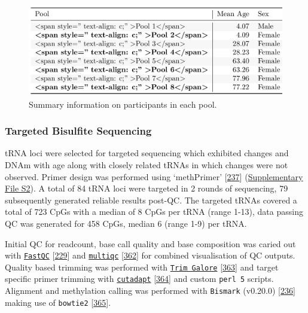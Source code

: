 \documentclass[
]{book}
\begin{document}
\begin{figure}

{\centering \includegraphics[width=1\linewidth]{figs/poolSummaryTable} 

}

\caption{Summary information on participants in each pool.}\label{fig:poolSummaryTable}
\end{figure}



\hypertarget{targetedBiSseq}{%
\subsubsection{Targeted Bisulfite Sequencing}\label{targetedBiSseq}}

tRNA loci were selected for targeted sequencing which exhibited changes and DNAm with age along with closely related tRNAs in which changes were not observed.
Primer design was performed using `methPrimer' {[}\protect\hyperlink{ref-Li2002}{237}{]} (\href{./Supplementary_Files/Targeted_BiS-seq_Primers.txt}{Supplementary File S2}).
A total of 84 tRNA loci were targeted in 2 rounds of sequencing, 79 subsequently generated reliable results post-QC.
The targeted tRNAs covered a total of 723 CpGs with a median of 8 CpGs per tRNA (range 1-13), data passing QC was generated for 458 CpGs, median 6 (range 1-9) per tRNA.

Initial QC for readcount, base call quality and base composition was caried out with \href{https://github.com/s-andrews/FastQC}{\texttt{FastQC}} {[}\protect\hyperlink{ref-Andrews2010}{229}{]} and \href{https://github.com/ewels/MultiQC}{\texttt{multiqc}} {[}\protect\hyperlink{ref-Ewels2016}{362}{]} for combined visualisation of QC outputs.
Quality based trimming was performed with \href{https://github.com/FelixKrueger/TrimGalore}{\texttt{Trim\ Galore}} {[}\protect\hyperlink{ref-Krueger2015}{363}{]} and target specific primer trimming with \href{https://github.com/marcelm/cutadapt}{\texttt{cutadapt}} {[}\protect\hyperlink{ref-Martin2011}{364}{]} and custom \texttt{perl\ 5} scripts.
Alignment and methylation calling was performed with \texttt{Bismark} (v0.20.0) {[}\protect\hyperlink{ref-Krueger2011}{236}{]} making use of \texttt{bowtie2} {[}\protect\hyperlink{ref-Langmead2012}{365}{]}.
\end{document}
